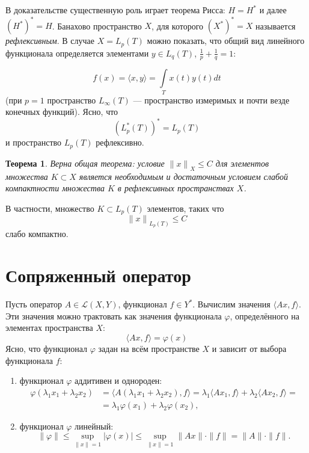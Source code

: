 \documentclass[12pt,a4paper,titlepage,oneside]{book}
\theoremstyle{definition}
\theoremstyle{plain}
\newtheorem*{theorem}{Теорема}
\theoremstyle{break}
\theoremstyle{remark}
\theoremstyle{remark}
\theoremstyle{remark}
\theoremstyle{remark}
\theoremstyle{plain}
\theoremstyle{plain}
\begin{document}
В доказательстве существенную роль играет теорема Рисса: $H=H^*$ и далее $(H^*)^*=H$. Банахово пространство $X$, для которого $(X^*)^*=X$ называется \textit{рефлексивным}. В случае $X=L_p(T)$ можно показать, что общий вид линейного функционала определяется элементами $y \in L_q(T)$, 
$\frac{1}{p}+ \frac{1}{q}=1$:

\begin{equation*}
f(x)= \langle x,y \rangle =\displaystyle\int\limits_T x(t)y(t)dt
\end{equation*}
(при $p=1$ пространство $L_\infty(T)$ --- пространство измеримых и почти везде конечных функций).
Ясно, что 
\begin{equation*}
{(L_p^*(T))}^*=L_p(T)
\end{equation*}
и пространство $L_p(T)$ рефлексивно.
\begin{theorem}
Верна общая теорема: условие ${\lVert x \lVert}_X \leqslant C$ для элементов множества $K \subset X$ является необходимым и достаточным условием слабой компактности множества $K$ в рефлексивных пространствах $X$.
\end{theorem}
В частности, множество $K \subset L_p(T)$ элементов, таких что 
\begin{equation*}
{\lVert x \lVert}_{L_p(T)} \leqslant C
\end{equation*}
слабо компактно.

\section{Сопряженный оператор}
Пусть оператор $A \in \mathcal{L}(X,Y)$, функционал $f \in Y^*$. Вычислим значения $ \langle Ax,f \rangle $. Эти значения можно трактовать как значения функционала $\varphi$, определённого на элементах пространства $X$:
\begin{equation}
 \langle Ax,f \rangle =\varphi(x)
\end{equation}
Ясно, что функционал $\varphi$ задан на всём пространстве $X$ и зависит от выбора функционала $f$:
\begin{enumerate}
\item функционал $\varphi$ аддитивен и однороден:
\begin{align*}
\varphi(\lambda_1x_1+\lambda_2x_2) &= 
 \langle A(\lambda_1x_1+\lambda_2x_2),f \rangle =
\lambda_1 \langle Ax_1,f \rangle  + \lambda_2 \langle Ax_2,f \rangle  =\\
&= \lambda_1\varphi(x_1) + \lambda_2\varphi(x_2),
\end{align*}
\item функционал $\varphi$ линейный:
$$\lVert \varphi \lVert \leqslant \underset{\lVert x\lVert =1}{\sup} 
\vert \varphi(x) \vert \leqslant  \underset{\lVert x\lVert =1}{\sup} 
\lVert Ax \lVert \cdot \lVert f \lVert =
 \lVert A \lVert \cdot \lVert f \lVert.$$
\end{enumerate}
\end{document}
